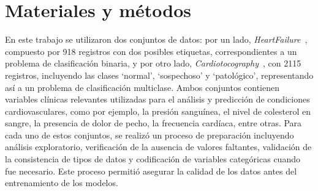 \documentclass{llncs}
\begin{document}
\section{Materiales y métodos}

En este trabajo se utilizaron dos conjuntos de datos: por un lado, \emph{HeartFailure}~\parencite{HeartFailure}, compuesto por 918 registros con dos posibles etiquetas, correspondientes a un problema de clasificación binaria, y por otro lado, \emph{Cardiotocography}~\parencite{Cardiotocografia}, con 2115 registros, incluyendo las clases `normal', `sospechoso' y `patológico', representando así a un problema de clasificación multiclase. Ambos conjuntos  contienen variables clínicas relevantes utilizadas para el análisis y predicción de condiciones cardiovasculares, como por ejemplo, la presión sanguínea, el nivel de colesterol en sangre, la presencia de dolor de pecho, la frecuencia cardíaca, entre otras.
Para cada uno de estos conjuntos, se realizó un proceso de preparación incluyendo análisis exploratorio, verificación de la ausencia de valores faltantes, validación de la consistencia de tipos de datos y codificación de variables categóricas cuando fue necesario. Este proceso permitió asegurar la calidad de los datos antes del entrenamiento de los modelos.
\end{document}
